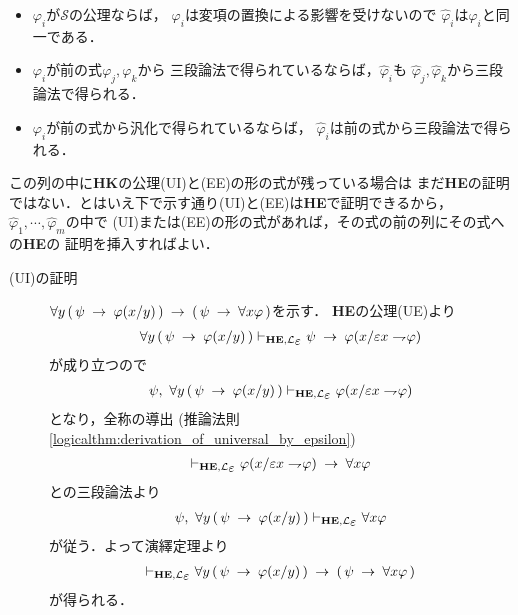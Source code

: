 \begin{metaprf}
\begin{description}
\begin{itemize}
					\item $\varphi_{i}$が$\mathscr{S}$の公理ならば，
						$\varphi_{i}$は変項の置換による影響を受けないので
						$\hat{\varphi}_{i}$は$\varphi_{i}$と同一である．
					
					\item $\varphi_{i}$が前の式$\varphi_{j},\varphi_{k}$から
						三段論法で得られているならば，$\hat{\varphi}_{i}$も
						$\hat{\varphi}_{j},\hat{\varphi}_{k}$から三段論法で得られる．
					
					\item $\varphi_{i}$が前の式から汎化で得られているならば，
						$\hat{\varphi}_{i}$は前の式から三段論法で得られる．
				\end{itemize}
			
				この列の中に{\bf HK}の公理(UI)と(EE)の形の式が残っている場合は
				まだ{\bf HE}の証明ではない．とはいえ下で示す通り(UI)と(EE)は{\bf HE}で証明できるから，
				$\hat{\varphi}_{1},\cdots,\hat{\varphi}_{m}$の中で
				(UI)または(EE)の形の式があれば，その式の前の列にその式への{\bf HE}の
				証明を挿入すればよい．
				
				\begin{description}
					\item[(UI)の証明]
						$\forall y\, (\, \psi \hspace{0.25em}\rightarrow\hspace{0.25em} \varphi(x/y)\, ) 
						\hspace{0.25em}\rightarrow\hspace{0.25em} (\, \psi \hspace{0.25em}\rightarrow\hspace{0.25em} \forall x \varphi\, )$を示す．
						{\bf HE}の公理(UE)より
						\begin{align}
							\forall y\, (\, \psi \rarrow \varphi(x/y)\, ) \provable{\mbox{{\bf HE}},\lang{\varepsilon}} 
							\psi \rarrow \varphi(x/\varepsilon x \negation \varphi)
						\end{align}
						が成り立つので
						\begin{align}
							\psi,\ \forall y\, (\, \psi \rarrow \varphi(x/y)\, ) \provable{\mbox{{\bf HE}},\lang{\varepsilon}} 
							\varphi(x/\varepsilon x \negation \varphi)
						\end{align}
						となり，全称の導出
						(推論法則\ref{logicalthm:derivation_of_universal_by_epsilon})
						\begin{align}
							\provable{\mbox{{\bf HE}},\lang{\varepsilon}} \varphi(x/\varepsilon x \negation \varphi)
							\rarrow \forall x \varphi
						\end{align}
						との三段論法より
						\begin{align}
							\psi,\ \forall y\, (\, \psi \rarrow \varphi(x/y)\, ) \provable{\mbox{{\bf HE}},\lang{\varepsilon}}
							\forall x \varphi
						\end{align}
						が従う．よって演繹定理より
						\begin{align}
							\provable{\mbox{{\bf HE}},\lang{\varepsilon}} \forall y\, (\, \psi \rarrow \varphi(x/y)\, )
							\rarrow (\, \psi \rarrow \forall x \varphi\, )
						\end{align}
						が得られる．
					

\end{description}
\end{description}
\end{metaprf}
